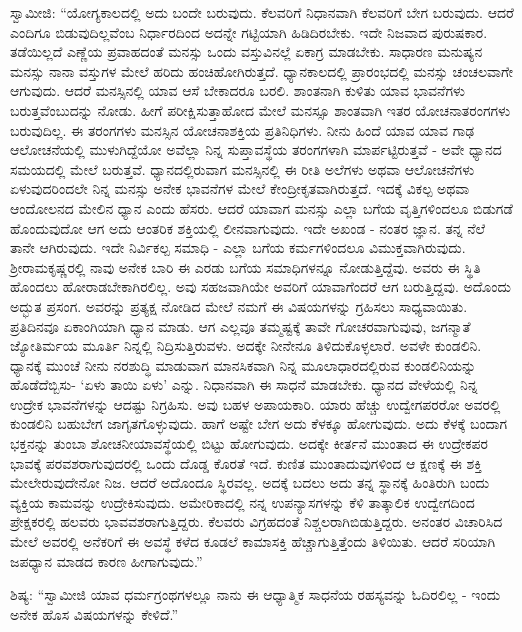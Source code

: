  ಸ್ವಾಮೀಜಿ: “ಯೋಗ್ಯಕಾಲದಲ್ಲಿ ಅದು ಬಂದೇ ಬರುವುದು. ಕೆಲವರಿಗೆ ನಿಧಾನವಾಗಿ ಕೆಲವರಿಗೆ ಬೇಗ ಬರುವುದು. ಆದರೆ ಎಂದಿಗೂ ಬಿಡುವುದಿಲ್ಲವೆಂಬ ನಿರ್ಧಾರದಿಂದ ಅದನ್ನೇ ಗಟ್ಟಿಯಾಗಿ ಹಿಡಿದಿರಬೇಕು. ಇದೇ ನಿಜವಾದ ಪುರುಷಕಾರ. ತಡೆಯಿಲ್ಲದೆ ಎಣ್ಣೆಯ ಪ್ರವಾಹದಂತೆ ಮನಸ್ಸು ಒಂದು ವಸ್ತುವಿನಲ್ಲೆ ಏಕಾಗ್ರ ಮಾಡಬೇಕು. ಸಾಧಾರಣ ಮನುಷ್ಯನ ಮನಸ್ಸು ನಾನಾ ವಸ್ತುಗಳ ಮೇಲೆ ಹರಿದು ಹಂಚಿಹೋಗಿರುತ್ತದೆ. ಧ್ಯಾನಕಾಲದಲ್ಲಿ ಪ್ರಾರಂಭದಲ್ಲಿ ಮನಸ್ಸು ಚಂಚಲವಾಗೇ ಆಗುವುದು. ಆದರೆ ಮನಸ್ಸಿನಲ್ಲಿ ಯಾವ ಆಸೆ ಬೇಕಾದರೂ ಬರಲಿ. ಶಾಂತನಾಗಿ ಕುಳಿತು ಯಾವ ಭಾವನೆಗಳು ಬರುತ್ತವೆಂಬುದನ್ನು ನೋಡು. ಹೀಗೆ ಪರೀಕ್ಷಿಸುತ್ತಾಹೋದ ಮೇಲೆ ಮನಸ್ಸೂ ಶಾಂತವಾಗಿ ಇತರ ಯೋಚನಾತರಂಗಗಳು ಬರುವುದಿಲ್ಲ. ಈ ತರಂಗಗಳು ಮನಸ್ಸಿನ ಯೋಚನಾಶಕ್ತಿಯ ಪ್ರತಿನಿಧಿಗಳು. ನೀನು ಹಿಂದೆ ಯಾವ ಯಾವ ಗಾಢ ಆಲೋಚನೆಯಲ್ಲಿ ಮುಳುಗಿದ್ದೆಯೋ ಅವೆಲ್ಲಾ ನಿನ್ನ ಸುಪ್ತಾವಸ್ಥೆಯ ತರಂಗಗಳಾಗಿ ಮಾರ್ಪಟ್ಟಿರುತ್ತವೆ - ಅವೇ ಧ್ಯಾನದ ಸಮಯದಲ್ಲಿ ಮೇಲೆ ಬರುತ್ತವೆ. ಧ್ಯಾನದಲ್ಲಿರುವಾಗ ಮನಸ್ಸಿನಲ್ಲಿ ಈ ರೀತಿ ಅಲೆಗಳು ಅಥವಾ ಆಲೋಚನೆಗಳು ಏಳುವುದರಿಂದಲೇ ನಿನ್ನ ಮನಸ್ಸು ಅನೇಕ ಭಾವನೆಗಳ ಮೇಲೆ ಕೇಂದ್ರೀಕೃತವಾಗಿರುತ್ತದೆ. ಇದಕ್ಕೆ ವಿಕಲ್ಪ ಅಥವಾ ಆಂದೋಲನದ ಮೇಲಿನ ಧ್ಯಾನ ಎಂದು ಹೆಸರು. ಆದರೆ ಯಾವಾಗ ಮನಸ್ಸು ಎಲ್ಲಾ ಬಗೆಯ ವೃತ್ತಿಗಳಿಂದಲೂ ಬಿಡುಗಡೆ ಹೊಂದುವುದೋ ಆಗ ಅದು ಆಂತರಿಕ ಶಕ್ತಿಯಲ್ಲಿ ಲೀನವಾಗುವುದು. ಇದೇ ಅಖಂಡ - ನಂತರ ಜ್ಞಾನ. ತನ್ನ ನೆಲೆ ತಾನೇ ಆಗಿರುವುದು. ಇದೇ ನಿರ್ವಿಕಲ್ಪ ಸಮಾಧಿ - ಎಲ್ಲಾ ಬಗೆಯ ಕರ್ಮಗಳಿಂದಲೂ ವಿಮುಕ್ತವಾಗಿರುವುದು. ಶ‍್ರೀರಾಮಕೃಷ್ಣರಲ್ಲಿ ನಾವು ಅನೇಕ ಬಾರಿ ಈ ಎರಡು ಬಗೆಯ ಸಮಾಧಿಗಳನ್ನೂ ನೋಡುತ್ತಿದ್ದೆವು. ಅವರು ಈ ಸ್ಥಿತಿ ಹೊಂದಲು ಹೋರಾಡಬೇಕಾಗಿರಲಿಲ್ಲ. ಅವು ಸಹಜವಾಗಿಯೇ ಅವರಿಗೆ ಯಾವಾಗೆಂದರೆ ಆಗ ಬರುತ್ತಿದ್ದವು. ಅದೊಂದು ಅದ್ಭುತ ಪ್ರಸಂಗ. ಅವರನ್ನು ಪ್ರತ್ಯಕ್ಷ ನೋಡಿದ ಮೇಲೆ ನಮಗೆ ಈ ವಿಷಯಗಳನ್ನು ಗ್ರಹಿಸಲು ಸಾಧ್ಯವಾಯಿತು. ಪ್ರತಿದಿನವೂ ಏಕಾಂಗಿಯಾಗಿ ಧ್ಯಾನ ಮಾಡು. ಆಗ ಎಲ್ಲವೂ ತಮ್ಮಷ್ಟಕ್ಕೆ ತಾವೇ ಗೋಚರವಾಗುವುವು, ಜಗನ್ಮಾತೆ ಜ್ಯೋತಿರ್ಮಯ ಮೂರ್ತಿ ನಿನ್ನಲ್ಲಿ ನಿದ್ರಿಸುತ್ತಿರುವಳು. ಅದಕ್ಕೇ ನೀನೇನೂ ತಿಳಿದುಕೊಳ್ಳಲಾರೆ. ಅವಳೇ ಕುಂಡಲಿನಿ. ಧ್ಯಾನಕ್ಕೆ ಮುಂಚೆ ನೀನು ನರಶುದ್ಧಿ ಮಾಡುವಾಗ ಮಾನಸಿಕವಾಗಿ ನಿನ್ನ ಮೂಲಾಧಾರದಲ್ಲಿರುವ ಕುಂಡಲಿನಿಯನ್ನು ಹೊಡೆದೆಬ್ಬಿಸು- ‘ಏಳು ತಾಯಿ ಏಳು’ ಎನ್ನು. ನಿಧಾನವಾಗಿ ಈ ಸಾಧನೆ ಮಾಡಬೇಕು. ಧ್ಯಾನದ ವೇಳೆಯಲ್ಲಿ ನಿನ್ನ ಉದ್ರೇಕ ಭಾವನೆಗಳನ್ನು ಆದಷ್ಟು ನಿಗ್ರಹಿಸು. ಅವು ಬಹಳ ಅಪಾಯಕಾರಿ. ಯಾರು ಹೆಚ್ಚು ಉದ್ವೇಗಪರರೋ ಅವರಲ್ಲಿ ಕುಂಡಲಿನಿ ಬಹುಬೇಗ ಜಾಗೃತಗೊಳ್ಳುವುದು. ಹಾಗೆ ಅಷ್ಟೇ ಬೇಗ ಅದು ಕೆಳಕ್ಕೂ ಹೋಗುವುದು. ಅದು ಕೆಳಕ್ಕೆ ಬಂದಾಗ ಭಕ್ತನನ್ನು ತುಂಬಾ ಶೋಚನೀಯಾವಸ್ಥೆಯಲ್ಲಿ ಬಿಟ್ಟು ಹೋಗುವುದು. ಅದಕ್ಕೇ ಕೀರ್ತನೆ ಮುಂತಾದ ಈ ಉದ್ರೇಕಪರ ಭಾವಕ್ಕೆ ಪರವಶರಾಗುವುದರಲ್ಲಿ ಒಂದು ದೊಡ್ಡ ಕೊರತೆ ಇದೆ. ಕುಣಿತ ಮುಂತಾದುವುಗಳಿಂದ ಆ ಕ್ಷಣಕ್ಕೆ ಈ ಶಕ್ತಿ ಮೇಲೇರುವುದೇನೋ ನಿಜ. ಆದರೆ ಅದೊಂದೂ ಸ್ಥಿರವಲ್ಲ. ಅದಕ್ಕೆ ಬದಲು ಅದು ತನ್ನ ಸ್ಥಾನಕ್ಕೆ ಹಿಂತಿರುಗಿ ಬಂದು ವ್ಯಕ್ತಿಯ ಕಾಮವನ್ನು ಉದ್ರೇಕಿಸುವುದು. ಅಮೇರಿಕಾದಲ್ಲಿ ನನ್ನ ಉಪನ್ಯಾಸಗಳನ್ನು ಕೆಳಿ ತಾತ್ಕಾಲಿಕ ಉದ್ವೇಗದಿಂದ ಪ್ರೇಕ್ಷಕರಲ್ಲಿ ಹಲವರು ಭಾವವಶರಾಗುತ್ತಿದ್ದರು. ಕೆಲವರು ವಿಗ್ರಹದಂತೆ ನಿಶ್ಚಲರಾಗಿಬಿಡುತ್ತಿದ್ದರು. ಅನಂತರ ವಿಚಾರಿಸಿದ ಮೇಲೆ ಅವರಲ್ಲಿ ಅನೆಕರಿಗೆ ಈ ಅವಸ್ಥೆ ಕಳೆದ ಕೂಡಲೆ ಕಾಮಾಸಕ್ತಿ ಹೆಚ್ಚಾಗುತ್ತಿತ್ತೆಂದು ತಿಳಿಯಿತು. ಆದರೆ ಸರಿಯಾಗಿ ಜಪಧ್ಯಾನ ಮಾಡದ ಕಾರಣ ಹೀಗಾಗುವುದು.” 

 ಶಿಷ್ಯ: “ಸ್ವಾಮೀಜಿ ಯಾವ ಧರ್ಮಗ್ರಂಥಗಳಲ್ಲೂ ನಾನು ಈ ಆಧ್ಯಾತ್ಮಿಕ ಸಾಧನೆಯ ರಹಸ್ಯವನ್ನು ಓದಿರಲಿಲ್ಲ - ಇಂದು ಅನೇಕ ಹೊಸ ವಿಷಯಗಳನ್ನು ಕೇಳಿದೆ.” 


